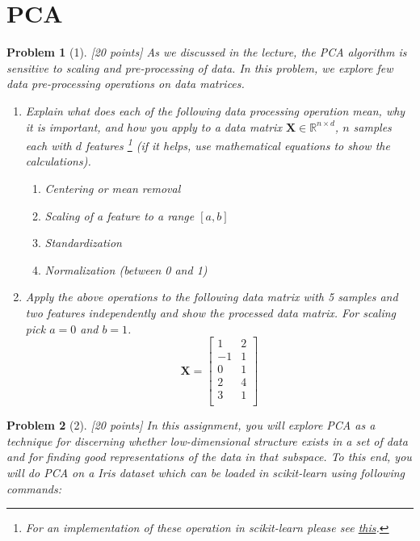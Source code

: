 \documentclass[12pt]{article}
\theoremstyle{quest}
\newtheorem*{problem}{Problem}
\begin{document}
\section*{PCA}
\begin{problem}[1] [20 points]
As we discussed in the lecture, the PCA algorithm is sensitive to scaling and pre-processing of data. In this problem, we explore few data pre-processing operations on data matrices.

\begin{enumerate}
    \item Explain what does each of the following data processing operation mean, why it is important, and how you apply to a data matrix $\bm{X} \in \mathbb{R}^{n \times d}$, $n$ samples each with $d$ features \footnote{For an implementation of these operation in \textsf{scikit-learn} please see \href{https://scikit-learn.org/stable/modules/preprocessing.html}{this}.} (if it helps, use mathematical equations to show the calculations).
    \begin{enumerate}
        \item Centering or mean removal
        \item Scaling of a feature to a range $[a, b]$
        \item Standardization
        \item Normalization (between 0 and 1)
    \end{enumerate}
    \item Apply the above operations to the following data matrix with 5 samples and two features independently and show the processed data matrix. For scaling pick $a = 0$ and $b = 1$.
        \begin{equation*}
            \bm{X} = \begin{bmatrix}
            1 & 2\\
            -1 & 1\\
            0 & 1\\
            2 & 4\\
            3 & 1\\
            \end{bmatrix}
        \end{equation*}
\end{enumerate}
\end{problem}

\begin{problem}[2] [20 points]
In this assignment, you will explore PCA as a technique for discerning whether low-dimensional structure exists in a set of data and for finding good representations of the data in that subspace. To this end, you will do PCA on a Iris dataset which can be loaded in \textsf{scikit-learn} using following commands:
\end{problem}
\end{document}
